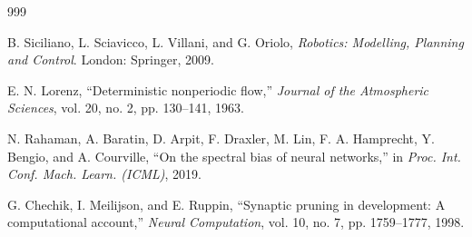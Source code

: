\documentclass[12pt,a4paper,oneside]{report}
\begin{document}
\begin{thebibliography}{999}

B. Siciliano, L. Sciavicco, L. Villani, and G. Oriolo, \textit{Robotics: Modelling, Planning and Control}. London: Springer, 2009.




E. N. Lorenz, ``Deterministic nonperiodic flow,'' \textit{Journal of the Atmospheric Sciences}, vol. 20, no. 2, pp. 130--141, 1963.




N. Rahaman, A. Baratin, D. Arpit, F. Draxler, M. Lin, F. A. Hamprecht, Y. Bengio, and A. Courville, ``On the spectral bias of neural networks,'' in \textit{Proc. Int. Conf. Mach. Learn. (ICML)}, 2019.




G. Chechik, I. Meilijson, and E. Ruppin, ``Synaptic pruning in development: A computational account,'' \textit{Neural Computation}, vol. 10, no. 7, pp. 1759--1777, 1998.



\end{thebibliography}
\end{document}
